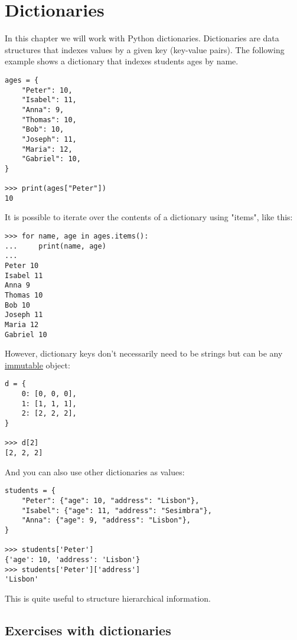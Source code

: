 \chapter{Dictionaries}\label{dictionaries}

In this chapter we will work with Python dictionaries. Dictionaries are data structures that indexes values by a given key (key-value pairs). The following example shows a dictionary that indexes students ages by name.

\begin{lstlisting}
ages = {
    "Peter": 10,
    "Isabel": 11,
    "Anna": 9,
    "Thomas": 10,
    "Bob": 10,
    "Joseph": 11,
    "Maria": 12,
    "Gabriel": 10,
}

>>> print(ages["Peter"])
10
\end{lstlisting}

It is possible to iterate over the contents of a dictionary using "items", like this:

\begin{lstlisting}
>>> for name, age in ages.items():
...     print(name, age)
...
Peter 10
Isabel 11
Anna 9
Thomas 10
Bob 10
Joseph 11
Maria 12
Gabriel 10
\end{lstlisting}

However, dictionary keys don't necessarily need to be strings but can be any \href{https://docs.python.org/3/tutorial/datastructures.html#dictionaries}{immutable} object:

\begin{lstlisting}
d = {
    0: [0, 0, 0],
    1: [1, 1, 1],
    2: [2, 2, 2],
}

>>> d[2]
[2, 2, 2]
\end{lstlisting}

And you can also use other dictionaries as values:

\begin{lstlisting}
students = {
    "Peter": {"age": 10, "address": "Lisbon"},
    "Isabel": {"age": 11, "address": "Sesimbra"},
    "Anna": {"age": 9, "address": "Lisbon"},
}

>>> students['Peter']
{'age': 10, 'address': 'Lisbon'}
>>> students['Peter']['address']
'Lisbon'
\end{lstlisting}

This is quite useful to structure hierarchical information.

\section{Exercises with dictionaries}

